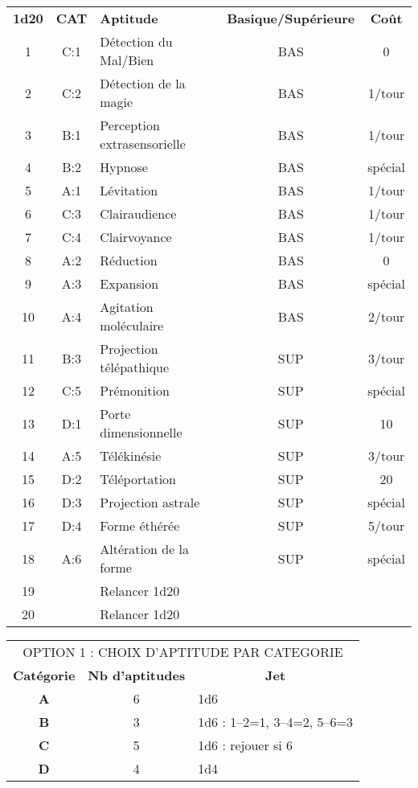 \begin{tabular}{cclcc}
\textbf{1d20}& \textbf{CAT} & \textbf{Aptitude} &  \textbf{Basique/Supérieure} & \textbf{Coût} \\
1   & C:1 & Détection du Mal/Bien       & BAS & 0 \\
2   & C:2 & Détection de la magie       & BAS & 1/tour \\
3   & B:1 & Perception extrasensorielle & BAS & 1/tour \\
4   & B:2 & Hypnose                     & BAS & spécial \\
5   & A:1 & Lévitation                  & BAS & 1/tour \\
6   & C:3 & Clairaudience               & BAS & 1/tour \\
7   & C:4 & Clairvoyance                & BAS & 1/tour \\
8   & A:2 & Réduction                   & BAS & 0 \\
9   & A:3 & Expansion                   & BAS & spécial \\
10  & A:4 & Agitation moléculaire       & BAS & 2/tour \\
11  & B:3 & Projection télépathique     & SUP & 3/tour \\
12  & C:5 & Prémonition                 & SUP & spécial \\
13  & D:1 & Porte dimensionnelle        & SUP & 10 \\
14  & A:5 & Télékinésie                 & SUP & 3/tour \\
15  & D:2 & Téléportation               & SUP & 20 \\
16  & D:3 & Projection astrale          & SUP & spécial \\
17  & D:4 & Forme éthérée               & SUP & 5/tour \\
18  & A:6 & Altération de la forme      & SUP & spécial \\
19  &     & Relancer 1d20               &  & \\
20  &     & Relancer 1d20               &  & \\
\end{tabular}

\bigskip

\begin{tabular}{ccl}
\multicolumn{3}{c}{OPTION 1 : CHOIX D'APTITUDE PAR CATEGORIE} \\
\textbf{Catégorie} &  \textbf{Nb d'aptitudes} & \multicolumn{1}{c}{\textbf{Jet}} \\
\textbf{A} & 6 & 1d6 \\
\textbf{B} & 3 & 1d6 : 1--2=1, 3--4=2, 5--6=3 \\
\textbf{C} & 5 & 1d6 : rejouer si 6 \\
\textbf{D} & 4 & 1d4 \\
\end{tabular}


